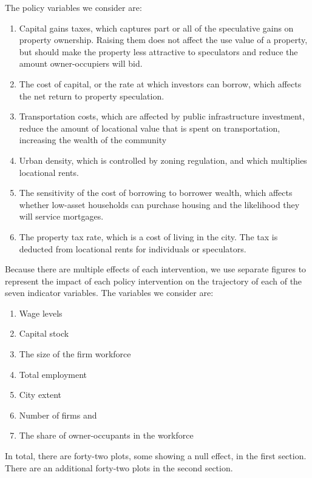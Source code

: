 The policy variables we consider are: 
\begin{enumerate}
\item Capital gains taxes, which captures part or all of the speculative gains on property ownership. Raising them does not affect the use value of a property, but should make the property less attractive to speculators and reduce the amount owner-occupiers will bid. 
\item The cost of capital, or the rate at which investors can borrow, which affects the net return to property speculation.
\item Transportation costs, which are affected by public infrastructure investment, reduce the amount of locational value that is spent on transportation, increasing the wealth of the community 
\item Urban density, which is controlled by zoning regulation, and which multiplies locational rents. 
\item The sensitivity of the cost of borrowing to borrower wealth, which affects whether low-asset households can purchase housing and the likelihood they will service mortgages.
\item The property tax rate, which is a cost of living in the city. The tax is deducted from locational rents for individuals or speculators.
\end{enumerate}
Because there are multiple effects of each intervention, we use separate figures to represent the impact of each policy intervention on the trajectory of each of the seven indicator variables. %
The variables we consider are:
\begin{enumerate}
    \item Wage levels
    \item Capital stock
    \item The size of the firm workforce
    \item Total employment
    \item City extent
    \item Number of firms and 
    \item The share of owner-occupants in the workforce
\end{enumerate} 
In total, there are forty-two plots, some showing a null effect, in the first section. There are an additional forty-two plots in the second section.

